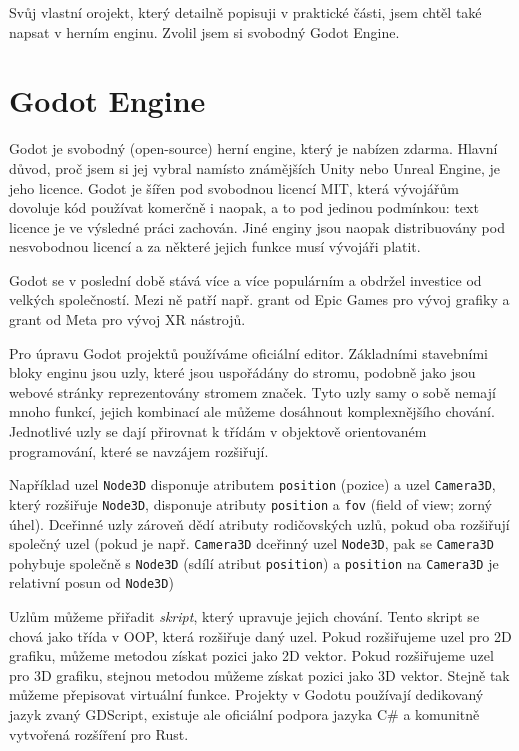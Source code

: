 Svůj vlastní orojekt, který detailně popisuji v praktické části, jsem chtěl také napsat v herním enginu. Zvolil jsem si svobodný Godot Engine.

\section{Godot Engine}

Godot je svobodný (open-source) herní engine, který je nabízen zdarma. Hlavní důvod, proč jsem si jej vybral namísto známějších Unity nebo Unreal Engine, je jeho licence. Godot je šířen pod svobodnou licencí MIT, která vývojářům dovoluje kód používat komerčně i naopak, a to pod jedinou podmínkou: text licence je ve výsledné práci zachován. Jiné enginy jsou naopak distribuovány pod nesvobodnou licencí a za některé jejich funkce musí vývojáři platit.

Godot se v poslední době stává více a více populárním a obdržel investice od velkých společností. Mezi ně patří např. grant od Epic Games pro vývoj grafiky a grant od Meta pro vývoj XR nástrojů. \cite{godot_epicgames} \cite{godot_meta}

Pro úpravu Godot projektů používáme oficiální editor. Základními stavebními bloky enginu jsou uzly, které jsou uspořádány do stromu, podobně jako jsou webové stránky reprezentovány stromem značek. Tyto uzly samy o sobě nemají mnoho funkcí, jejich kombinací ale můžeme dosáhnout komplexnějšího chování. Jednotlivé uzly se dají přirovnat k třídám v objektově orientovaném programování, které se navzájem rozšiřují.

Například uzel \texttt{Node3D} disponuje atributem \texttt{position} (pozice) a uzel \texttt{Camera3D}, který rozšiřuje \texttt{Node3D}, disponuje atributy \texttt{position} a \texttt{fov} (field of view; zorný úhel). Dceřinné uzly zároveň dědí atributy rodičovských uzlů, pokud oba rozšiřují společný uzel (pokud je např. \texttt{Camera3D} dceřinný uzel \texttt{Node3D}, pak se \texttt{Camera3D} pohybuje společně s \texttt{Node3D} (sdílí atribut \texttt{position}) a \texttt{position} na \texttt{Camera3D} je relativní posun od \texttt{Node3D})

Uzlům můžeme přiřadit \textit{skript}, který upravuje jejich chování. Tento skript se chová jako třída v OOP, která rozšiřuje daný uzel. Pokud rozšiřujeme uzel pro 2D grafiku, můžeme metodou získat pozici jako 2D vektor. Pokud rozšiřujeme uzel pro 3D grafiku, stejnou metodou můžeme získat pozici jako 3D vektor. Stejně tak můžeme přepisovat virtuální funkce. Projekty v Godotu používají dedikovaný jazyk zvaný GDScript, existuje ale oficiální podpora jazyka C\# a komunitně vytvořená rozšíření pro Rust.

